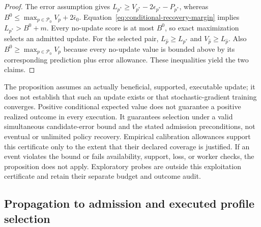 \documentclass[10pt]{article}
\begin{document}
\begin{proof}
The error assumption gives
$L_{p^*}\ge V_{p^*}-2\epsilon_{p^*}-P_{p^*}$, whereas
$B^0\le\max_{p\in\mathcal P_0}V_p+2\bar\epsilon_0$.
Equation~\eqref{eq:conditional-recovery-margin} implies
$L_{p^*}>B^0+m$. Every no-update score is at most $B^0$, so exact maximization
selects an admitted update. For the selected pair,
$L_{\widehat p}\ge L_{p^*}$ and $V_{\widehat p}\ge L_{\widehat p}$.
Also $B^0\ge\max_{p\in\mathcal P_0}V_p$ because every no-update value is
bounded above by its corresponding prediction plus error allowance.
These inequalities yield the two claims.
\end{proof}

The proposition assumes an actually beneficial, supported, executable update;
it does not establish that such an update exists or that stochastic-gradient
training converges. Positive conditional expected value does not guarantee a
positive realized outcome in every execution. It guarantees selection under a valid simultaneous
candidate-error bound and the stated admission preconditions, not eventual or
unlimited policy recovery. Empirical calibration allowances support this
certificate only to the extent that their declared coverage is justified.
If an event violates the bound or fails availability, support, loss, or worker
checks, the proposition does not apply. Exploratory probes are outside this
exploitation certificate and retain their separate budget and outcome audit.


\subsection{Propagation to admission and executed profile selection}
\label{sec:downstream-sensitivity}
\end{document}
